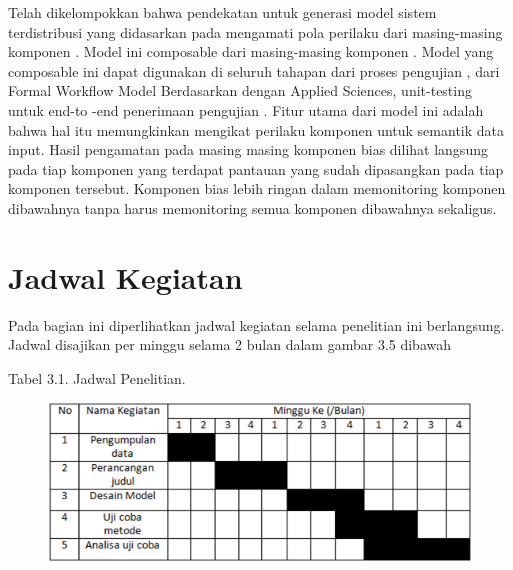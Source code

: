 \documentclass{jtetiproposalskripsi}
\begin{document}
Telah dikelompokkan bahwa pendekatan untuk generasi model sistem terdistribusi yang didasarkan pada mengamati pola perilaku dari masing-masing komponen . Model ini composable dari masing-masing komponen . Model yang composable ini dapat digunakan di seluruh tahapan dari proses pengujian , dari  Formal Workflow Model Berdasarkan dengan  Applied Sciences, unit-testing untuk end-to -end penerimaan pengujian . Fitur utama dari model ini adalah bahwa hal itu memungkinkan mengikat perilaku komponen untuk semantik data input. Hasil pengamatan pada masing masing komponen bias dilihat langsung pada tiap komponen yang terdapat pantauan yang sudah dipasangkan pada tiap komponen tersebut. Komponen bias lebih ringan dalam memonitoring komponen dibawahnya tanpa harus memonitoring semua komponen dibawahnya sekaligus.


\section{Jadwal Kegiatan}
Pada bagian ini diperlihatkan jadwal kegiatan selama penelitian ini berlangsung.  Jadwal disajikan per minggu selama 2 bulan dalam gambar 3.5 dibawah 

\begin{center}
Tabel 3.1. Jadwal Penelitian.
\end{center}
\vspace{-0.5cm}
\begin{figure}[ht!]
  \centering
    \includegraphics[width=13cm]{gambar/10}
\end{figure}

\end{document}
